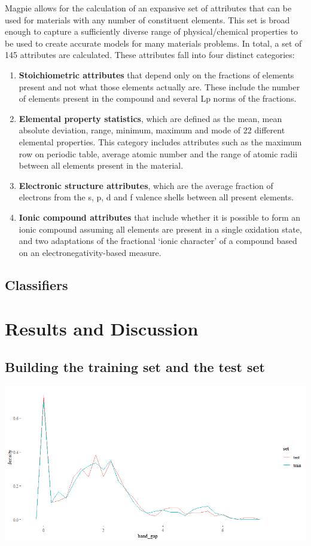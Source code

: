 \documentclass[10pt, letter]{report}
\renewcommand{\=}{\, =\, }
\newcommand{\+}{\, +\, }
\renewcommand{\-}{\, -\, }
\begin{document}
Magpie allows for the calculation of an expansive set of attributes that can be used for materials with any number of constituent elements. This set is broad enough to capture a sufficiently diverse range of physical/chemical properties to be used to create accurate models for many materials problems. In total, a set of 145 attributes are calculated. These attributes fall into four distinct categories:
\begin{enumerate}
\item \textbf{Stoichiometric attributes} that depend only on the fractions of elements present and not what those elements actually are. These include the number of elements present in the compound and several Lp norms of the fractions.
\item \textbf{Elemental property statistics}, which are defined as the mean, mean absolute deviation, range, minimum, maximum and mode of 22 different elemental properties. This category includes attributes such as the maximum row on periodic table, average atomic number and the range of atomic radii between all elements present in the material.
\item \textbf{Electronic structure attributes}, which are the average fraction of electrons from the s, p, d and f valence shells between all present elements.
\item \textbf{Ionic compound attributes} that include whether it is possible to form an ionic compound assuming all elements are present in a single oxidation state, and two adaptations of the fractional ‘ionic character’ of a compound based on an electronegativity-based measure.
\end{enumerate}

\section{Classifiers}

\chapter{Results and Discussion}

\section{Building the training set and the test set}
\begin{center}
\includegraphics[scale=0.35]{train_test_distributions.png}
\end{center}
\end{document}
